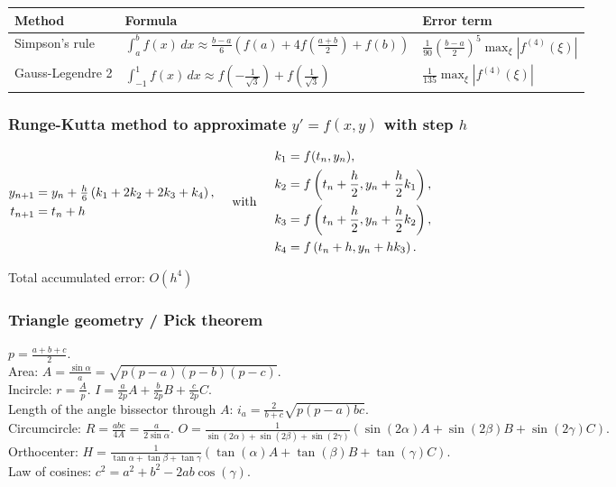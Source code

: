\documentclass[landscape,a4paper,twocolumn,10pt]{report}
\begin{document}
\begin{tabular}{@{}ll|l@{}}
Method & Formula & Error term \\
\hline
Simpson's rule &
$\int_a^b f(x) \, dx \approx \frac{b-a}{6} (f(a) + 4 f(\frac{a+b}{2}) + f(b))$ &
$\frac{1}{90}\left(\frac{b-a}{2}\right)^5 \max_\xi |f^{(4)}(\xi)|$
\\

Gauss-Legendre 2 &
$\int_{-1}^1 f(x) \, dx \approx f(-\frac{1}{\sqrt{3}}) + f(\frac{1}{\sqrt{3}})$ &
$\frac{1}{135} \max_\xi |f^{(4)}(\xi)|$
\end{tabular}

\subsubsection*{Runge-Kutta method to approximate $y'=f(x,y)$ with step $h$}
$\begin{aligned}
y_{n+1} &= y_n + \tfrac{h}{6}\left(k_1 + 2k_2 + 2k_3 + k_4 \right),\\
t_{n+1} &= t_n + h \\
\end{aligned}
\hspace{0.5cm} \mbox{with} \hspace{0.5cm}
\begin{aligned}
 k_1 &= f(t_n, y_n), \\
 k_2 &= f\left(t_n + \frac{h}{2}, y_n + \frac{h}{2}k_1\right), \\
 k_3 &= f\left(t_n + \frac{h}{2}, y_n + \frac{h}{2}k_2\right), \\
 k_4 &= f\left(t_n + h, y_n + h k_3\right).
\end{aligned}
$

\noindent Total accumulated error: $O(h^4)$

\subsubsection*{Triangle geometry / Pick theorem}

$p=\frac{a+b+c}{2}$.\\
Area: $A=\frac{\sin\alpha}{a}=\sqrt{p(p-a)(p-b)(p-c)}$.\\
Incircle: $r=\frac{A}{p}$. $I=\frac{a}{2p}A+\frac{b}{2p}B+\frac{c}{2p}C$.\\
Length of the angle bissector through $A$: $i_a=\frac{2}{b+c}\sqrt{p(p-a)bc}$.\\
Circumcircle: $R=\frac{abc}{4A}=\frac{a}{2\sin\alpha}$. $O=\frac{1}{\sin(2\alpha)+\sin(2\beta)+\sin(2\gamma)}(\sin(2\alpha)A+\sin(2\beta)B+\sin(2\gamma)C)$.\\
Orthocenter: $H=\frac{1}{\tan\alpha+\tan\beta+\tan\gamma}(\tan(\alpha)A+\tan(\beta)B+\tan(\gamma)C)$.\\
Law of cosines: $c^2=a^2+b^2-2ab\cos(\gamma)$.
\end{document}
